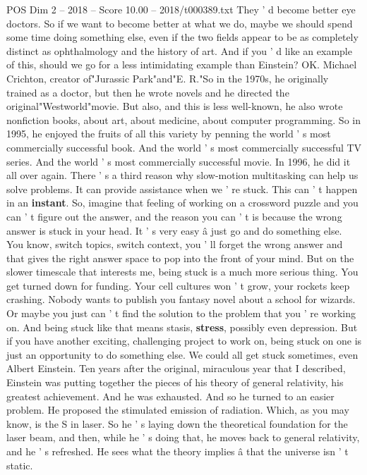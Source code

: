 \begin{textsample}{POS Dim 2 – 2018 – Score 10.00 – 2018/t000389.txt}
They ' d become better eye doctors.
So if we want to become better at what we do, maybe we should spend some time doing something else, even if the two fields appear to be as completely distinct as ophthalmology and the history of art.
And if you ' d like an example of this, should we go for a less intimidating example than Einstein?
OK.
Michael Crichton, creator of"Jurassic Park"and"E.
R."So in the 1970s, he originally trained as a doctor, but then he wrote novels and he directed the original"Westworld"movie.
But also, and this is less well-known, he also wrote nonfiction books, about art, about medicine, about computer programming.
So in 1995, he enjoyed the fruits of all this variety by penning the world ' s most commercially successful book.
And the world ' s most commercially successful TV series.
And the world ' s most commercially successful movie.
In 1996, he did it all over again.
There ' s a third reason why slow-motion multitasking can help us solve problems.
It can provide assistance when we ' re stuck.
This can ' t happen in an \textbf{instant}.
So, imagine that feeling of working on a crossword puzzle and you can ' t figure out the answer, and the reason you can ' t is because the wrong answer is stuck in your head.
It ' s very easy â just go and do something else.
You know, switch topics, switch context, you ' ll forget the wrong answer and that gives the right answer space to pop into the front of your mind.
But on the slower timescale that interests me, being stuck is a much more serious thing.
You get turned down for funding.
Your cell cultures won ' t grow, your rockets keep crashing.
Nobody wants to publish you fantasy novel about a school for wizards.
Or maybe you just can ' t find the solution to the problem that you ' re working on.
And being stuck like that means stasis, \textbf{stress}, possibly even depression.
But if you have another exciting, challenging project to work on, being stuck on one is just an opportunity to do something else.
We could all get stuck sometimes, even Albert Einstein.
Ten years after the original, miraculous year that I described, Einstein was putting together the pieces of his theory of general relativity, his greatest achievement.
And he was exhausted.
And so he turned to an easier problem.
He proposed the stimulated emission of radiation.
Which, as you may know, is the S in laser.
So he ' s laying down the theoretical foundation for the laser beam, and then, while he ' s doing that, he moves back to general relativity, and he ' s refreshed.
He sees what the theory implies â that the universe isn ' t static.

\end{textsample}
